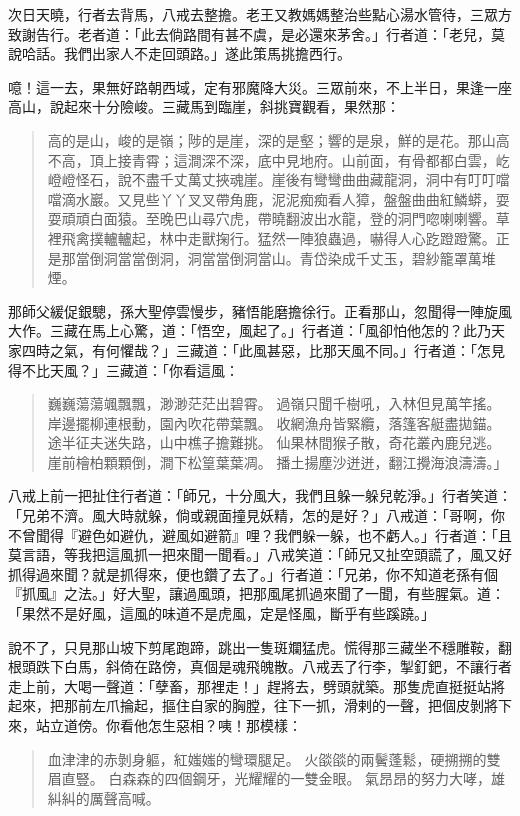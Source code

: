 次日天曉，行者去背馬，八戒去整擔。老王又教媽媽整治些點心湯水管待，三眾方致謝告行。老者道：「此去倘路間有甚不虞，是必還來茅舍。」行者道：「老兒，莫說哈話。我們出家人不走回頭路。」遂此策馬挑擔西行。

噫！這一去，果無好路朝西域，定有邪魔降大災。三眾前來，不上半日，果逢一座高山，說起來十分險峻。三藏馬到臨崖，斜挑寶觀看，果然那：
\begin{quote}
高的是山，峻的是嶺；陟的是崖，深的是壑；響的是泉，鮮的是花。那山高不高，頂上接青霄；這澗深不深，底中見地府。山前面，有骨都都白雲，屹嶝嶝怪石，說不盡千丈萬丈挾魂崖。崖後有彎彎曲曲藏龍洞，洞中有叮叮噹噹滴水巖。又見些丫丫叉叉帶角鹿，泥泥痴痴看人獐，盤盤曲曲紅鱗蟒，耍耍頑頑白面猿。至晚巴山尋穴虎，帶曉翻波出水龍，登的洞門唿喇喇響。草裡飛禽撲轤轤起，林中走獸掬行。猛然一陣狼蟲過，嚇得人心趷蹬蹬驚。正是那當倒洞當當倒洞，洞當當倒洞當山。青岱染成千丈玉，碧紗籠罩萬堆煙。
\end{quote}

那師父緩促銀驄，孫大聖停雲慢步，豬悟能磨擔徐行。正看那山，忽聞得一陣旋風大作。三藏在馬上心驚，道：「悟空，風起了。」行者道：「風卻怕他怎的？此乃天家四時之氣，有何懼哉？」三藏道：「此風甚惡，比那天風不同。」行者道：「怎見得不比天風？」三藏道：「你看這風：
\begin{quote}
巍巍蕩蕩颯飄飄，渺渺茫茫出碧霄。
過嶺只聞千樹吼，入林但見萬竿搖。
岸邊擺柳連根動，園內吹花帶葉飄。
收網漁舟皆緊纜，落篷客艇盡拋錨。
途半征夫迷失路，山中樵子擔難挑。
仙果林間猴子散，奇花叢內鹿兒逃。
崖前檜柏顆顆倒，澗下松篁葉葉凋。
播土揚塵沙迸迸，翻江攪海浪濤濤。」
\end{quote}

八戒上前一把扯住行者道：「師兄，十分風大，我們且躲一躲兒乾淨。」行者笑道：「兄弟不濟。風大時就躲，倘或親面撞見妖精，怎的是好？」八戒道：「哥啊，你不曾聞得『避色如避仇，避風如避箭』哩？我們躲一躲，也不虧人。」行者道：「且莫言語，等我把這風抓一把來聞一聞看。」八戒笑道：「師兄又扯空頭謊了，風又好抓得過來聞？就是抓得來，便也鑽了去了。」行者道：「兄弟，你不知道老孫有個『抓風』之法。」好大聖，讓過風頭，把那風尾抓過來聞了一聞，有些腥氣。道：「果然不是好風，這風的味道不是虎風，定是怪風，斷乎有些蹊蹺。」

說不了，只見那山坡下剪尾跑蹄，跳出一隻斑斕猛虎。慌得那三藏坐不穩雕鞍，翻根頭跌下白馬，斜倚在路傍，真個是魂飛魄散。八戒丟了行李，掣釘鈀，不讓行者走上前，大喝一聲道：「孽畜，那裡走！」趕將去，劈頭就築。那隻虎直挺挺站將起來，把那前左爪掄起，摳住自家的胸膛，往下一抓，滑剌的一聲，把個皮剝將下來，站立道傍。你看他怎生惡相？咦！那模樣：
\begin{quote}
血津津的赤剝身軀，紅媸媸的彎環腿足。
火燄燄的兩鬢蓬鬆，硬搠搠的雙眉直豎。
白森森的四個鋼牙，光耀耀的一雙金眼。
氣昂昂的努力大哮，雄糾糾的厲聲高喊。
\end{quote}

